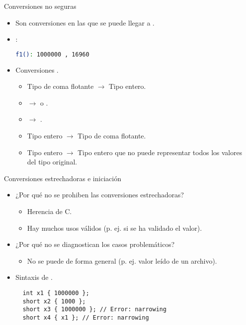 \begin{frame}[t,fragile]{Conversiones no seguras}
\vspace{-0.5em}
\begin{itemize}
  \item Son conversiones en las que se puede llegar a 
        .


  \item {}:
\begin{lstlisting}[language=bash,basicstyle=\footnotesize\ttfamily]
f1(): 1000000 , 16960
\end{lstlisting}

  \item Conversiones .
    \begin{itemize}
      \item Tipo de coma flotante $\rightarrow$ Tipo entero.
      \item {} $\rightarrow$  o .
      \item {} $\rightarrow$ .
      \item Tipo entero $\rightarrow$ Tipo de coma flotante.
      \item Tipo entero $\rightarrow$ Tipo entero que no puede representar todos los valores del tipo original.
    \end{itemize}
\end{itemize}
\end{frame}

\begin{frame}[t,fragile]{Conversiones estrechadoras e iniciación}
\begin{itemize}
  \item ¿Por qué no se prohiben las conversiones estrechadoras?
    \begin{itemize}
      \item Herencia de C.
      \item Hay muchos usos válidos (p. ej. si se ha validado el valor).
    \end{itemize}

  \item ¿Por qué no se diagnostican los casos problemáticos?
    \begin{itemize}
      \item No se puede de forma general (p. ej. valor leído de un archivo).
    \end{itemize}

  \item Sintaxis de .
\begin{lstlisting}
  int x1 { 1000000 };
  short x2 { 1000 };
  short x3 { 1000000 }; // Error: narrowing
  short x4 { x1 }; // Error: narrowing
\end{lstlisting}
\end{itemize}
\end{frame}

